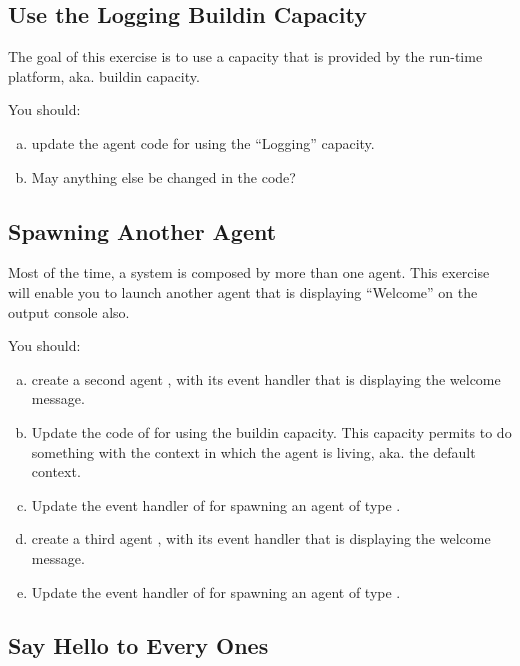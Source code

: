 \documentclass[article,english,nodocumentinfo]{utbmciadreport}
\begin{document}

\subsection{Use the Logging Buildin Capacity}

The goal of this exercise is to use a capacity that is provided by the run-time platform, aka. buildin capacity.

You should:
\begin{enumerate}[a)]
\item update the agent code for using the ``Logging'' capacity.
\item May anything else be changed in the code?
\end{enumerate}

\subsection{Spawning Another Agent}

Most of the time, a system is composed by more than one agent. This exercise will enable you to launch another agent that is displaying ``Welcome'' on the output console also.

You should:
\begin{enumerate}[a)]
\item create a second agent , with its  event handler that is displaying the welcome message.
\item Update the code of  for using the  buildin capacity. This capacity permits to do something with the context in which the agent is living, aka. the default context.
\item Update the  event handler of  for spawning an agent of type .
\item create a third agent , with its  event handler that is displaying the welcome message.
\item Update the  event handler of  for spawning an agent of type .
\end{enumerate}

\subsection{Say Hello to Every Ones}
\end{document}
